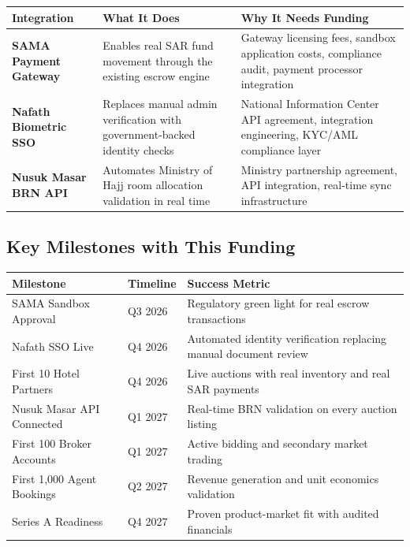 \documentclass[11pt,a4paper]{article}
\begin{document}
\begin{center}
\begin{tabular}{|>{\raggedright\arraybackslash}p{3.5cm}|>{\raggedright\arraybackslash}p{4cm}|>{\raggedright\arraybackslash}p{6cm}|}
\hline
\rowcolor{headergray}
\textbf{Integration} & \textbf{What It Does} & \textbf{Why It Needs Funding} \\
\hline
\textbf{SAMA Payment Gateway} & Enables real SAR fund movement through the existing escrow engine & Gateway licensing fees, sandbox application costs, compliance audit, payment processor integration \\
\hline
\textbf{Nafath Biometric SSO} & Replaces manual admin verification with government-backed identity checks & National Information Center API agreement, integration engineering, KYC/AML compliance layer \\
\hline
\textbf{Nusuk Masar BRN API} & Automates Ministry of Hajj room allocation validation in real time & Ministry partnership agreement, API integration, real-time sync infrastructure \\
\hline
\end{tabular}
\end{center}

\vspace{0.5cm}

\subsection*{Key Milestones with This Funding}

\begin{center}
\begin{tabular}{|>{\raggedright\arraybackslash}p{4cm}|>{\raggedright\arraybackslash}p{2cm}|>{\raggedright\arraybackslash}p{7.5cm}|}
\hline
\rowcolor{headergray}
\textbf{Milestone} & \textbf{Timeline} & \textbf{Success Metric} \\
\hline
SAMA Sandbox Approval & Q3 2026 & Regulatory green light for real escrow transactions \\
\hline
Nafath SSO Live & Q4 2026 & Automated identity verification replacing manual document review \\
\hline
First 10 Hotel Partners & Q4 2026 & Live auctions with real inventory and real SAR payments \\
\hline
Nusuk Masar API Connected & Q1 2027 & Real-time BRN validation on every auction listing \\
\hline
First 100 Broker Accounts & Q1 2027 & Active bidding and secondary market trading \\
\hline
First 1,000 Agent Bookings & Q2 2027 & Revenue generation and unit economics validation \\
\hline
Series A Readiness & Q4 2027 & Proven product-market fit with audited financials \\
\hline
\end{tabular}
\end{center}
\end{document}
